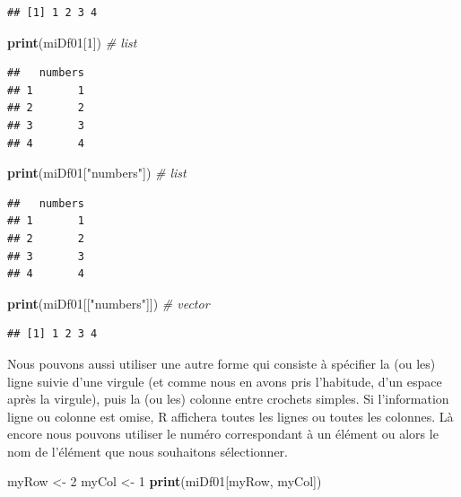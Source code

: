 \documentclass[twoside,symmetric]{book}
\newenvironment{Shaded}{}{}
\newcommand{\CommentTok}[1]{\textit{#1}}
\newcommand{\DecValTok}[1]{#1}
\newcommand{\KeywordTok}[1]{\textbf{#1}}
\newcommand{\NormalTok}[1]{#1}
\newcommand{\StringTok}[1]{#1}
\begin{document}
\begin{verbatim}
## [1] 1 2 3 4
\end{verbatim}

\begin{Shaded}
\begin{Highlighting}[]
\KeywordTok{print}\NormalTok{(miDf01[}\DecValTok{1}\NormalTok{]) }\CommentTok{# list}
\end{Highlighting}
\end{Shaded}

\begin{verbatim}
##   numbers
## 1       1
## 2       2
## 3       3
## 4       4
\end{verbatim}

\begin{Shaded}
\begin{Highlighting}[]
\KeywordTok{print}\NormalTok{(miDf01[}\StringTok{"numbers"}\NormalTok{]) }\CommentTok{# list}
\end{Highlighting}
\end{Shaded}

\begin{verbatim}
##   numbers
## 1       1
## 2       2
## 3       3
## 4       4
\end{verbatim}

\begin{Shaded}
\begin{Highlighting}[]
\KeywordTok{print}\NormalTok{(miDf01[[}\StringTok{"numbers"}\NormalTok{]]) }\CommentTok{# vector}
\end{Highlighting}
\end{Shaded}

\begin{verbatim}
## [1] 1 2 3 4
\end{verbatim}

Nous pouvons aussi utiliser une autre forme qui consiste à spécifier la (ou les) ligne suivie d'une virgule (et comme nous en avons pris l'habitude, d'un espace après la virgule), puis la (ou les) colonne entre crochets simples. Si l'information ligne ou colonne est omise, R affichera toutes les lignes ou toutes les colonnes. Là encore nous pouvons utiliser le numéro correspondant à un élément ou alors le nom de l'élément que nous souhaitons sélectionner.

\begin{Shaded}
\begin{Highlighting}[]
\NormalTok{myRow <-}\StringTok{ }\DecValTok{2}
\NormalTok{myCol <-}\StringTok{ }\DecValTok{1}
\KeywordTok{print}\NormalTok{(miDf01[myRow, myCol])}
\end{Highlighting}
\end{Shaded}
\end{document}

